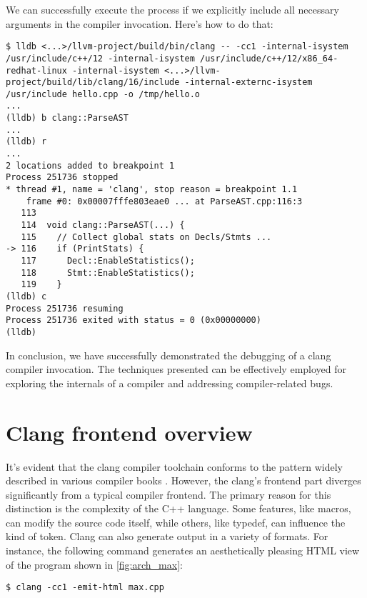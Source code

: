 We can successfully execute the process if we explicitly include all necessary
arguments in the compiler invocation. Here's how to do that: 
\begin{verbatim}
$ lldb <...>/llvm-project/build/bin/clang -- -cc1 -internal-isystem /usr/include/c++/12 -internal-isystem /usr/include/c++/12/x86_64-redhat-linux -internal-isystem <...>/llvm-project/build/lib/clang/16/include -internal-externc-isystem /usr/include hello.cpp -o /tmp/hello.o
...
(lldb) b clang::ParseAST
...
(lldb) r
...
2 locations added to breakpoint 1
Process 251736 stopped
* thread #1, name = 'clang', stop reason = breakpoint 1.1
    frame #0: 0x00007fffe803eae0 ... at ParseAST.cpp:116:3
   113  
   114  void clang::ParseAST(...) {
   115    // Collect global stats on Decls/Stmts ...
-> 116    if (PrintStats) {
   117      Decl::EnableStatistics();
   118      Stmt::EnableStatistics();
   119    }
(lldb) c
Process 251736 resuming
Process 251736 exited with status = 0 (0x00000000) 
(lldb)
\end{verbatim}
In conclusion, we have successfully demonstrated the debugging of a clang
compiler invocation. The techniques presented can be effectively employed for
exploring the internals of a compiler and addressing compiler-related bugs. 

\section{Clang frontend overview}
It's evident that the clang compiler toolchain conforms to the pattern widely
described in various compiler books
\citep{book:engineering_a_compiler}. However, the clang's frontend part diverges
significantly from a typical compiler frontend. The primary reason for this
distinction is the complexity of the C++ language. Some features, like macros,
can modify the source code itself, while others, like typedef, can influence the
kind of token. Clang can also generate output in a variety of formats. For
instance, the following command generates an aesthetically pleasing HTML view of
the program shown in \cref{fig:arch_max}: 

\begin{adjustwidth}{0em}{0em}
\begin{verbatim}
$ clang -cc1 -emit-html max.cpp
\end{verbatim}
\end{adjustwidth}

